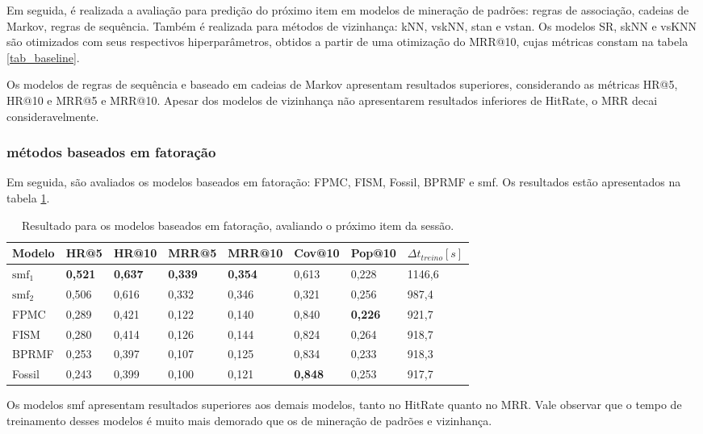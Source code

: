 Em seguida, é realizada a avaliação para predição do próximo item em modelos de
mineração de padrões: regras de associação, cadeias de Markov, regras de
sequência. Também é realizada para métodos de vizinhança: kNN, vskNN, stan e
vstan. Os modelos SR, skNN e vsKNN são otimizados com seus respectivos
hiperparâmetros, obtidos a partir de uma otimização do MRR@10, cujas
métricas constam na tabela \ref{tab_baseline}.

Os modelos de regras de sequência e baseado em cadeias de Markov apresentam
resultados superiores, considerando as métricas HR@5, HR@10 e MRR@5 e MRR@10.
Apesar dos modelos de vizinhança não apresentarem resultados inferiores de HitRate,
o MRR decai consideravelmente.

\subsubsection{métodos baseados em fatoração}
Em seguida, são avaliados os modelos baseados em fatoração: FPMC, FISM, Fossil,
BPRMF e smf. Os resultados estão apresentados na tabela \ref{tab_fatoracao}.

\begin{table}[htbp]
  \centering
  \begin{tabular}{|l|l|l|l|l|l|l|l|}
    \hline
    Modelo & HR@5 & HR@10 & MRR@5 & MRR@10 & Cov@10 & Pop@10 & $\Delta t_{treino} [s]$ \\
    \hline
    $\text{smf}_1$ & \textbf{0,521} & \textbf{0,637} & \textbf{0,339} & \textbf{0,354} & 0,613 & 0,228 & 1146,6 \\
    \hline
    $\text{smf}_2$ & 0,506 & 0,616 & 0,332 & 0,346 & 0,321 & 0,256 & 987,4 \\
    \hline
    FPMC & 0,289 & 0,421 & 0,122 & 0,140 & 0,840 & \textbf{0,226} & 921,7 \\
    \hline
    FISM & 0,280 & 0,414 & 0,126 & 0,144 & 0,824 & 0,264 & 918,7 \\
    \hline
    BPRMF & 0,253 & 0,397 & 0,107 & 0,125 & 0,834 & 0,233 & 918,3 \\
    \hline
    Fossil & 0,243 & 0,399 & 0,100 & 0,121 & \textbf{0,848} & 0,253 & 917,7 \\
    \hline
        \end{tabular}
  \caption{Resultado para os modelos baseados em fatoração, avaliando o próximo item da sessão.}
  \label{tab_fatoracao}
\end{table}

Os modelos smf apresentam resultados superiores aos demais modelos, tanto no
HitRate quanto no MRR. Vale observar que o tempo de treinamento desses modelos é
muito mais demorado que os de mineração de padrões e vizinhança.

